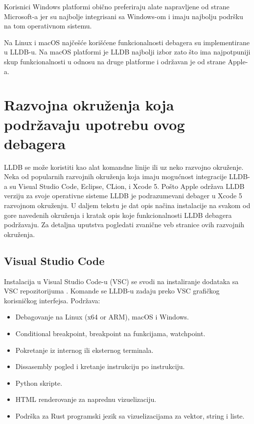 \documentclass[a4paper]{article}
\begin{document}
Korisnici Windows platformi obično preferiraju alate napravljene od strane Microsoft-a jer su najbolje integrisani sa Windows-om i imaju najbolju podršku na tom operativnom sistemu.

Na Linux i macOS najčešće korišćene funkcionalnosti debagera su implementirane u LLDB-u. Na macOS platformi je LLDB najbolji izbor zato što ima najpotpuniji skup funkcionalnosti u odnosu na druge platforme i održavan je od strane Apple-a.

\section{Razvojna okruženja koja podržavaju upotrebu ovog debagera}
\label{sec:Koja razvojna okruzenja podrzavaju upotrebu ovog debagera i kako?}

LLDB se može koristiti kao alat komandne linije ili uz neko razvojno okruženje. Neka od popularnih razvojnih okruženja koja imaju mogućnost integracije LLDB-a su Visual Studio Code, Eclipse, CLion, i Xcode 5. Pošto Apple održava LLDB verziju za svoje operativne sisteme LLDB je podrazumevani debager u Xcode 5 razvojnom okruženju. 
U daljem tekstu je dat opis načina instalacije na svakom od gore navedenih okruženja i kratak opis koje funkcionalnosti LLDB debagera podržavaju. Za detaljna uputstva pogledati zvanične veb stranice ovih razvojnih okruženja.

\subsection*{Visual Studio Code}
Instalacija u Visual Studio Code-u (VSC) se svodi na instaliranje dodataka sa VSC repozitorijuma \cite{visual_code_plugin}. Komande se LLDB-u zadaju preko VSC grafičkog korisničkog interfejsa. 
Podržava:
\begin{itemize}
\item Debagovanje na Linux (x64 or ARM), macOS i Windows.
\item Conditional breakpoint, breakpoint na funkcijama, watchpoint.
\item Pokretanje iz internog ili eksternog terminala.
\item Dissasembly pogled i kretanje instrukciju po instrukciju.
\item Python skripte.
\item HTML renderovanje za naprednu vizuelizaciju.
\item Podrška za Rust programski jezik sa vizuelizacijama za vektor, string i liste.
\end{itemize}
\end{document}
